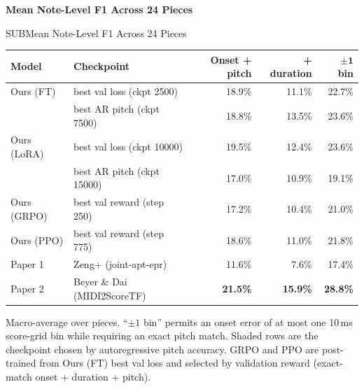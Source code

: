 \documentclass[border=14pt]{standalone}
\begin{document}
\begin{minipage}{15.4cm}
  \centering
  {\Large\bfseries Mean Note-Level F1 Across 24 Pieces\par}
  \vspace{3pt}
  {\small\color{muted}SUBMean Note-Level F1 Across 24 Pieces\par}
  \vspace{10pt}

  \renewcommand{\arraystretch}{1.35}
  \setlength{\tabcolsep}{12pt}
  \begin{tabular}{>{\raggedright\arraybackslash}p{2.5cm}
                  >{\raggedright\arraybackslash}p{4.5cm} r r r}
    \arrayrulecolor{ruleblue}
    \toprule
    \rowcolor{headerblue}
    \textbf{Model} &
    \textbf{Checkpoint} &
    \textbf{Onset + pitch} &
    \textbf{+ duration} &
    \textbf{$\boldsymbol{\pm 1}$ bin} \\
    \midrule
    Ours (FT)    & best val loss \textcolor{muted}{(ckpt 2500)} & 18.9\% & 11.1\% & 22.7\% \\
    \rowcolor{bandgrey}
                 & best AR pitch \textcolor{muted}{(ckpt 7500)} & 18.8\% & 13.5\% & 23.6\% \\
    Ours (LoRA)  & best val loss \textcolor{muted}{(ckpt 10000)} & 19.5\% & 12.4\% & 23.6\% \\
    \rowcolor{bandgrey}
                 & best AR pitch \textcolor{muted}{(ckpt 15000)} & 17.0\% & 10.9\% & 19.1\% \\
    \midrule
    Ours (GRPO)  & best val reward \textcolor{muted}{(step 250)} & 17.2\% & 10.4\% & 21.0\% \\
    Ours (PPO)   & best val reward \textcolor{muted}{(step 775)} & 18.6\% & 11.0\% & 21.8\% \\
    \midrule
    Paper 1      & Zeng+ \textcolor{muted}{(joint-apt-epr)} & 11.6\% & 7.6\% & 17.4\% \\
    Paper 2      & Beyer \& Dai \textcolor{muted}{(MIDI2ScoreTF)} & \textbf{21.5\%} & \textbf{15.9\%} & \textbf{28.8\%} \\
    \bottomrule
  \end{tabular}

  \vspace{8pt}
  {\footnotesize\color{muted}
    Macro-average over pieces. ``$\pm 1$ bin'' permits an onset error of at most
    one 10\,ms score-grid bin while requiring an exact pitch match.
    Shaded rows are the checkpoint chosen by autoregressive pitch accuracy.
    GRPO and PPO are post-trained from Ours (FT) best val loss and selected by
    validation reward (exact-match onset + duration + pitch).\par}
\end{minipage}
\end{document}
